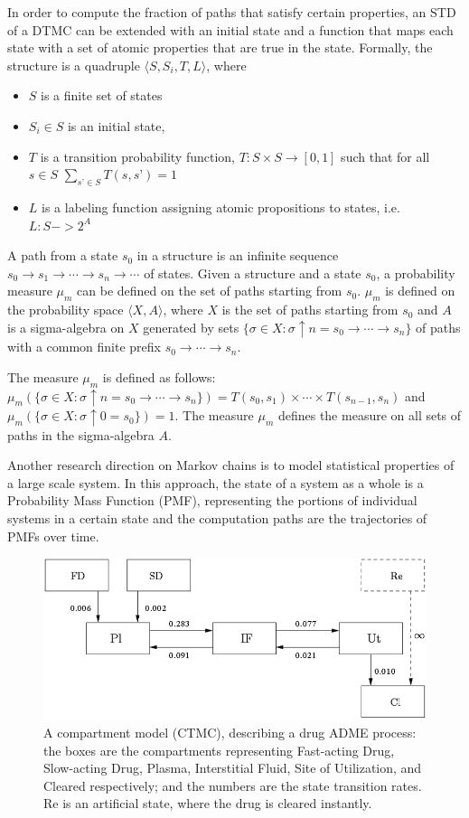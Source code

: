 \documentclass[
graybox,
envcountchap
]{svmult}
\begin{document}
\begin{bibunit}
In order to compute the fraction of paths that satisfy certain properties, an STD of a DTMC can be extended with an initial state and a function that maps each state with a set of atomic properties that are true in the state. Formally, the structure is a quadruple $\langle S, S_i, T, L\rangle$, where
\begin{itemize}
\item $S$ is a finite set of states
\item $S_i\in S$ is an initial state,
\item $T$ is a transition probability function, $T: S\times S \rightarrow [0,1]$ such that for all $s\in S$
$\sum_{s’\in S} T(s,s’) = 1$
\item $L$ is a labeling function assigning atomic propositions to states, i.e. $L: S->2^A$
\end{itemize}


A path from a state $s_0$ in a structure is an infinite sequence
$s_0 \rightarrow s_1 \rightarrow \cdots \rightarrow s_n \rightarrow\cdots$ of states. Given a structure and a state $s_0$, a probability measure $\mu_m$ can be defined on the set of paths starting from $s_0$. $\mu_m$ is defined on the probability space $\langle X, A\rangle$, where $X$ is the set of paths starting from $s_0$ and $A$ is a sigma-algebra on $X$ generated by sets $\{\sigma \in X: \sigma\uparrow n = s_0 \rightarrow\cdots\rightarrow s_n\}$ of paths with a common finite prefix $s_0\rightarrow\cdots\rightarrow s_n$.

The measure $\mu_m$ is defined as follows:
$\mu_m(\{\sigma \in X: \sigma\uparrow n = s_0 \rightarrow\cdots\rightarrow s_n\}) = 
T(s_0,s_1)\times\cdots\times T(s_{n-1},s_n)$ and $\mu_m(\{\sigma \in X: \sigma\uparrow 0 = s_0\}) = 1$. The measure $\mu_m$ defines the measure on all sets of paths in the sigma-algebra $A$.


Another research direction on Markov chains is to model statistical properties of a large scale system. In this approach, the state of a system as a whole is a Probability Mass Function (PMF), representing the portions of individual systems in a certain state and the computation paths are the trajectories of PMFs over time.

\begin{figure}
\centering
\includegraphics[width=.6\columnwidth]{assets/compartment_model.png}
\caption{
    A compartment model (CTMC), describing a drug ADME process: the boxes are the compartments representing Fast-acting Drug, Slow-acting Drug, Plasma, Interstitial Fluid, Site of Utilization, and Cleared respectively; and the numbers are the state transition rates. Re is an artificial state, where the drug is cleared instantly.}
\label{fig:comparment}
\end{figure}


\end{bibunit}
\end{document}
